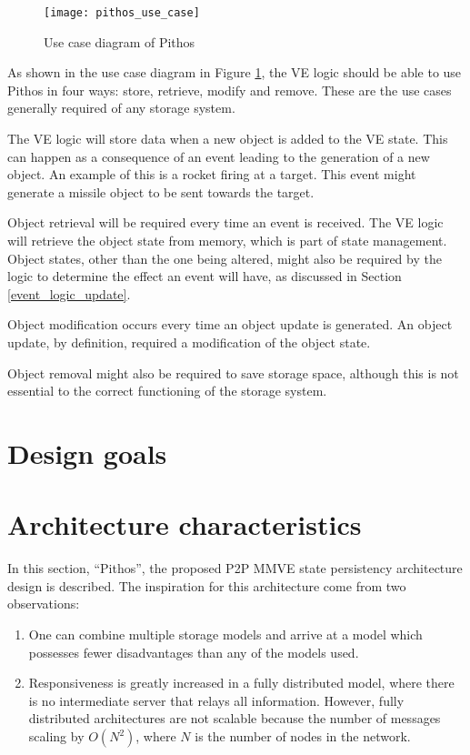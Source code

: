 \begin{figure}[htbp]
 \centering
 \texttt{[image: pithos\_use\_case]}
 \caption{Use case diagram of Pithos}
 \label{fig_pithos_use_case}
\end{figure}

As shown in the use case diagram in Figure \ref{fig_pithos_use_case}, the VE logic should be able to use Pithos in four ways: store, retrieve, modify and remove. These are the use cases generally required of any storage system.

The VE logic will store data when a new object is added to the VE state. This can happen as a consequence of an event leading to the generation of a new object. An example of this is a rocket firing at a target. This event might generate a missile object to be sent towards the target.

Object retrieval will be required every time an event is received. The VE logic will retrieve the object state from memory, which is part of state management. Object states, other than the one being altered, might also be required by the logic to determine the effect an event will have, as discussed in Section \ref{event_logic_update}.

Object modification occurs every time an object update is generated. An object update, by definition, required a modification of the object state.

Object removal might also be required to save storage space, although this is not essential to the correct functioning of the storage system.

\section{Design goals}

\section{Architecture characteristics}

In this section, ``Pithos'', the proposed P2P MMVE state persistency architecture design is described. The inspiration for this architecture come
from two observations:
%
\begin{enumerate}
  \item One can combine multiple storage models and arrive at a model which possesses fewer disadvantages than any of the models used.
  \item Responsiveness is greatly increased in a fully distributed model, where there is no intermediate server that relays all information.
      However, fully distributed architectures are not scalable because the number of messages scaling by $O(N^2)$, where $N$ is the number of
      nodes in the network.
\end{enumerate}

